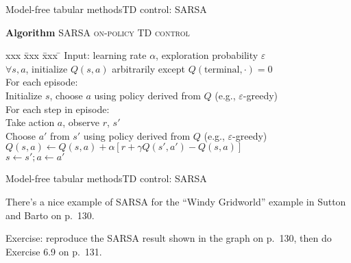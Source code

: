 \documentclass{beamer}
\begin{document}
\begin{frame}{Model-free tabular methods}{TD control: SARSA}

  \begin{block}{\textbf{Algorithm} \textsc{SARSA on-policy TD control}}
  \begin{tabbing}
    xxx \= xxx \= xxx \= \kill
    \> Input: learning rate $\alpha$, exploration probability $\varepsilon$ \\
    \> $\forall s, a$, initialize $Q(s,a)$ arbitrarily
    except $Q(\mathrm{terminal},\cdot) = 0$ \\
    \> For each episode: \\
    \> \> Initialize $s$, choose $a$ using policy derived from $Q$ (e.g., $\varepsilon$-greedy) \\
    \> \> For each step in episode: \\
    \> \> \> Take action $a$, observe $r$, $s'$ \\
    \> \> \> Choose $a'$ from $s'$ using policy derived from $Q$ (e.g., $\varepsilon$-greedy) \\
    \> \> \> $Q(s,a) \leftarrow Q(s,a) + \alpha \left[ r + \gamma Q(s', a') - Q(s, a) \right]$ \\
    \> \> \> $s \leftarrow s'; a \leftarrow a'$
  \end{tabbing}
  \end{block}

\end{frame}


\begin{frame}{Model-free tabular methods}{TD control: SARSA}

  There's a nice example of SARSA for the ``Windy Gridworld'' example
  in Sutton and Barto on p.\ 130.

  \medskip

  \alert{Exercise:} reproduce the SARSA result shown in the graph on
  p.\ 130, then do Exercise 6.9 on p.\ 131.

\end{frame}
\end{document}
